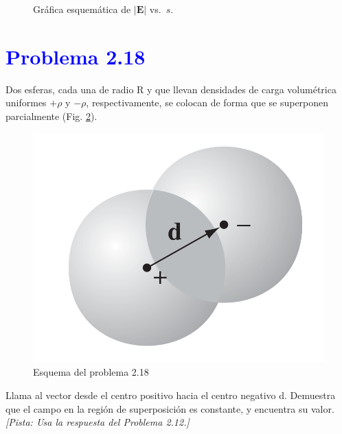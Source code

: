 \documentclass[12pt]{article}
\def\a{3}      %
\def\Emax{4}   %
\def\b{8}      %
\begin{document}
\begin{figure}[H]
  \centering
  \caption{Gráfica esquemática de \(|\mathbf{E} |\) vs.\ \(s\).}
  \label{fig:EvsS}
\end{figure}


\section*{\textcolor{blue}{Problema 2.18}}
Dos esferas, cada una de radio R y que llevan densidades de carga volumétrica uniformes \(+ \rho\)  y \( -\rho\), respectivamente, se colocan de forma que se superponen parcialmente (Fig. \ref{fig:figura2.28}).

\begin{figure}[ht]
    \centering
    \includegraphics[width=0.4\linewidth]{imagenes/6_IMG.png}
    \caption{Esquema del problema 2.18}
    \label{fig:figura2.28}
\end{figure}

Llama al vector desde el centro positivo hacia el centro negativo d.
Demuestra que el campo en la región de superposición es constante, y encuentra su valor.
\textit{[Pista: Usa la respuesta del Problema 2.12.]}
\end{document}

